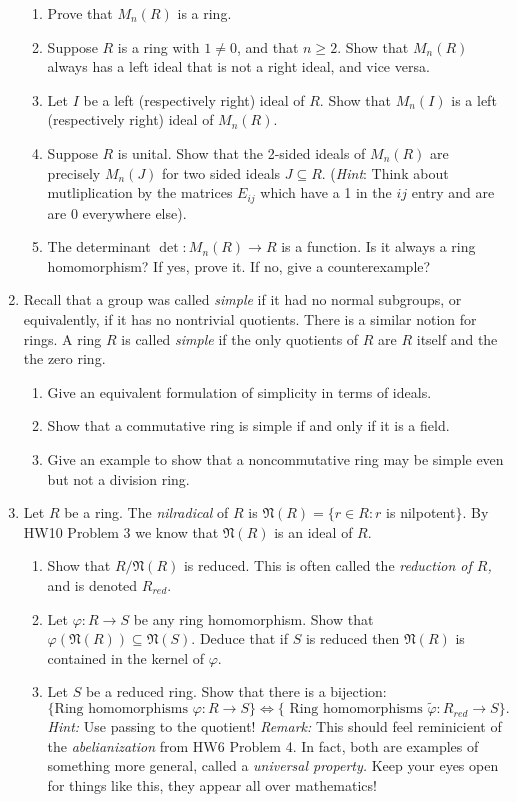 \documentclass[11pt]{article}
\newcommand{\fN}{\mathfrak{N}}
\begin{document}
\begin{enumerate}
{  \begin{enumerate}
    \item{
    Prove that $M_n(R)$ is a ring.
    }
    \item{
    Suppose $R$ is a ring with $1\not=0$, and that $n\ge2$.  Show that $M_n(R)$ always has a left ideal that is not a right ideal, and vice versa.
    }
    \item{
    Let $I$ be a left (respectively right) ideal of $R$.  Show that $M_n(I)$ is a left (respectively right) ideal of $M_n(R)$.
    }
    \item{
    Suppose $R$ is unital.  Show that the 2-sided ideals of $M_n(R)$ are precisely $M_n(J)$ for two sided ideals $J\subseteq R$.  (\textit{Hint}: Think about mutliplication by the matrices $E_{ij}$ which have a 1 in the $ij$ entry and are are 0 everywhere else).
    }
    \item{
    The determinant $\det:M_n(R)\to R$ is a function.  Is it always a ring homomorphism?  If yes, prove it.  If no, give a counterexample?
    }
  \end{enumerate}
  }
  \item{
  Recall that a group was called \textit{simple} if it had no normal subgroups, or equivalently, if it has no nontrivial quotients.  There is a similar notion for rings.  A ring $R$ is called \textit{simple} if the only quotients of $R$ are $R$ itself and the the zero ring.
  \begin{enumerate}
    \item{Give an equivalent formulation of simplicity in terms of ideals.}
    \item{Show that a commutative ring is simple if and only if it is a field.}
    \item{Give an example to show that a noncommutative ring may be simple even but not a division ring.}
  \end{enumerate}
  }
  \item{
  Let $R$ be a ring.  The \textit{nilradical} of $R$ is $\fN(R)=\{r\in R:r$ is nilpotent$\}$.  By HW10 Problem 3 we know that $\fN(R)$ is an ideal of $R$.
  \begin{enumerate}
    \item{Show that $R/\fN(R)$ is reduced.  This is often called the \textit{reduction of $R$,} and is denoted $R_{red}$.}
    \item{Let $\varphi:R\to S$ be any ring homomorphism.  Show that $\varphi(\fN(R))\subseteq\fN(S)$.  Deduce that if $S$ is reduced then $\fN(R)$ is contained in the kernel of $\varphi$.}
    \item{Let $S$ be a reduced ring.  Show that there is a bijection:
    \[\{\text{Ring homomorphisms }\varphi:R\to S\}\Longleftrightarrow\{\text{ Ring homomorphisms }\tilde\varphi:R_{red}\to S\}.\]
    \textit{Hint:} Use passing to the quotient!  \textit{Remark: }This should feel reminicient of the \textit{abelianization} from HW6 Problem 4.  In fact, both are examples of something more general, called a \textit{universal property.}  Keep your eyes open for things like this, they appear all over mathematics!}
  \end{enumerate}
  }
\end{enumerate}
\end{document}
